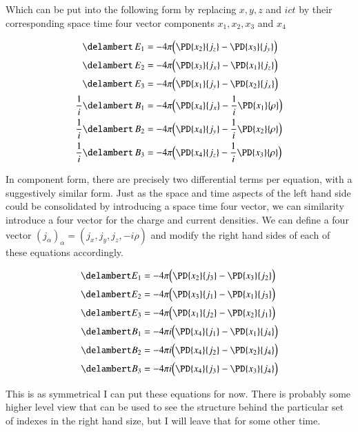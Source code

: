Which can be put into the following form by replacing $x, y, z$ and $ict$ by their 
corresponding space time four vector components $x_1, x_2, x_3$ and $x_4$

\begin{align*}
            \delambert \,E_1 &= - 4\pi \Bigl( \PD{x_2}{j_z} -             \PD{x_3}{j_y} \Bigr) \\
            \delambert \,E_2 &= - 4\pi \Bigl( \PD{x_3}{j_x} -             \PD{x_1}{j_z} \Bigr) \\
            \delambert \,E_3 &= - 4\pi \Bigl( \PD{x_1}{j_y} -             \PD{x_2}{j_x} \Bigr) \\
\frac{1}{i} \delambert \,B_1 &= - 4\pi \Bigl( \PD{x_4}{j_x} - \frac{1}{i} \PD{x_1}{\rho} \Bigr)\\
\frac{1}{i} \delambert \,B_2 &= - 4\pi \Bigl( \PD{x_4}{j_y} - \frac{1}{i} \PD{x_2}{\rho} \Bigr)\\
\frac{1}{i} \delambert \,B_3 &= - 4\pi \Bigl( \PD{x_4}{j_z} - \frac{1}{i} \PD{x_3}{\rho} \Bigr)
\end{align*}

In component form,
there are precisely two differential terms per equation, with a suggestively 
similar form.
Just as the space and time aspects of the left hand side could be consolidated
by introducing a space time four vector, we can similarity introduce a four 
vector for the 
charge and current densities.
We can define a four vector $(j_\alpha)_\alpha = 
(j_x, j_y, j_z, -i \rho)$ and modify the right hand sides of each of these equations 
accordingly.

\begin{align*}
\delambert E_1 &= -4\pi \Bigl(\PD{x_2}{j_3} - \PD{x_3}{j_2} \Bigr) \\
\delambert E_2 &= -4\pi \Bigl(\PD{x_3}{j_1} - \PD{x_1}{j_3} \Bigr) \\
\delambert E_3 &= -4\pi \Bigl(\PD{x_1}{j_2} - \PD{x_2}{j_1} \Bigr) \\
\delambert B_1 &= -4\pi i \Bigl(\PD{x_4}{j_1} - \PD{x_1}{j_4} \Bigr)\\
\delambert B_2 &= -4\pi i \Bigl(\PD{x_4}{j_2} - \PD{x_2}{j_4} \Bigr)\\
\delambert B_3 &= -4\pi i \Bigl(\PD{x_4}{j_3} - \PD{x_3}{j_4} \Bigr)
\end{align*}

This is as symmetrical I can put these equations for now.  There is probably some higher level 
view that can be used to see the structure behind the particular set of indexes in the right 
hand size, but I will leave that for some other time.

